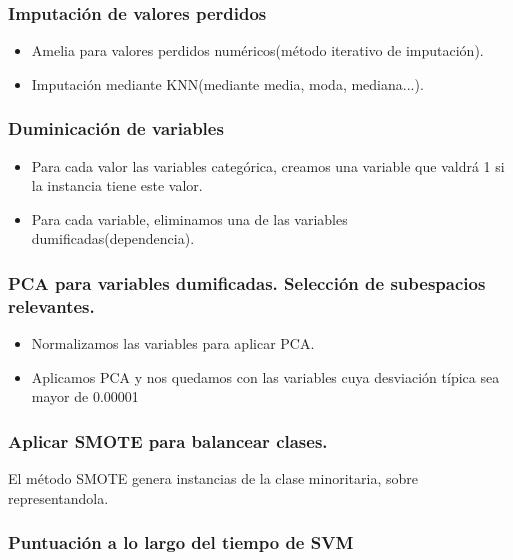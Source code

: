 \begin{frame}

\frametitle{Imputación de valores perdidos}

\begin{itemize}
	\item Amelia para valores perdidos numéricos(método iterativo de imputación).
	
	\item Imputación mediante KNN(mediante media, moda, mediana...).
\end{itemize}

\end{frame}


\begin{frame}
\frametitle{Duminicación de variables}

\begin{itemize}
	\item Para cada valor las variables categórica, creamos una variable que valdrá 1 si la instancia tiene este valor.
	\item Para cada variable, eliminamos una de las variables dumificadas(dependencia).
\end{itemize}

\end{frame}

\begin{frame}
\frametitle{PCA para variables dumificadas. Selección de subespacios relevantes.}

\begin{itemize}
	\item Normalizamos las variables para aplicar PCA.
	\item Aplicamos PCA y nos quedamos con las variables cuya desviación típica sea mayor de 0.00001
\end{itemize}
\end{frame}

\begin{frame}
\frametitle{Aplicar SMOTE para balancear clases.}

El método SMOTE genera instancias de la clase minoritaria, sobre representandola. 


\end{frame}


\begin{frame}
\frametitle{Puntuación a lo largo del tiempo de SVM}



\end{frame}